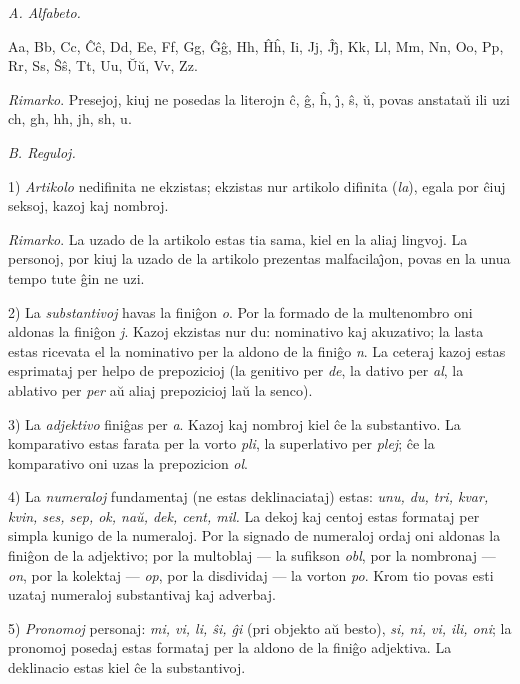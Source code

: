 \begin{center}
\sl A. Alfabeto.
\end{center}

   Aa, Bb, Cc, \^C\^c, Dd, Ee, Ff, Gg, \^G\^g, Hh, \^H\^h, Ii, Jj, \^J\^{\j}, Kk,
   Ll, Mm, Nn, Oo, Pp, Rr, Ss, \^S\^s, Tt, Uu, \u U\u u, Vv, Zz.

   {\it Rimarko}. Presejoj, kiuj ne posedas la literojn \^c, \^g, \^h, \^{\j}, \^s,
\u u, povas anstata\u u ili uzi ch, gh, hh, jh, sh, u.

\begin{center}
\sl B. Reguloj.
\end{center}


1) {\sl Artikolo} nedifinita ne ekzistas; ekzistas nur artikolo
difinita (\emph{la}), egala por \^ciuj seksoj, kazoj kaj nombroj.

   {\it Rimarko}. La uzado de la artikolo estas tia sama, kiel en la aliaj
lingvoj. La personoj, por kiuj la uzado de la artikolo prezentas
malfacila\^{\j}on, povas en la unua tempo tute \^gin ne uzi.

2) La \emph{substantivoj} havas la fini\^gon \emph{o}. Por la formado de la
multenombro oni aldonas la fini\^gon \emph{j}. Kazoj ekzistas nur du:
nominativo kaj akuzativo; la lasta estas ricevata el la nominativo
per la aldono de la fini\^go \emph{n}. La ceteraj kazoj estas
esprimataj per helpo de prepozicioj (la genitivo per \emph{de}, la
dativo per \emph{al}, la ablativo per \emph{per} a\u u aliaj prepozicioj
la\u u la senco).

3) La \emph{adjektivo} fini\^gas per \emph{a}. Kazoj kaj nombroj kiel \^ce la
substantivo. La komparativo estas farata per la vorto \emph{pli}, la
superlativo per \emph{plej}; \^ce la komparativo oni uzas la
prepozicion \emph{ol}.

4) La \emph{numeraloj} fundamentaj (ne estas deklinaciataj) estas: \emph{unu,
du, tri, kvar, kvin, ses, sep, ok, na\u u, dek, cent, mil.} La dekoj
kaj centoj estas formataj per simpla kunigo de la numeraloj. Por la
signado de numeraloj ordaj oni aldonas la fini\^gon de la adjektivo;
por la multoblaj --- la sufikson \emph{obl}, por la nombronaj ---
\emph{on}, por la kolektaj --- \emph{op}, por la disdividaj --- la vorton
\emph{po}. Krom tio povas esti uzataj numeraloj substantivaj kaj
adverbaj. 

5) \emph{Pronomoj} personaj: \emph{mi, vi, li, \^si, \^gi} (pri objekto a\u u besto),
\emph{si, ni, vi, ili, oni}; la pronomoj posedaj estas formataj per la
aldono de la fini\^go adjektiva. La deklinacio estas kiel \^ce la
substantivoj.

